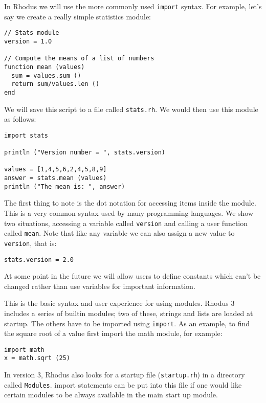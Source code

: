 In Rhodus we will use the more commonly used {\tt import} syntax. For example, let's say we create a really simple statistics module:

\begin{lstlisting}
// Stats module
version = 1.0

// Compute the means of a list of numbers
function mean (values)
  sum = values.sum ()
  return sum/values.len ()
end
\end{lstlisting}

We will save this script to a file called {\tt stats.rh}. We would then use this module as follows:

\begin{lstlisting}
import stats

println ("Version number = ", stats.version)

values = [1,4,5,6,2,4,5,8,9]
answer = stats.mean (values)
println ("The mean is: ", answer)
\end{lstlisting}

The first thing to note is the dot notation for accessing items inside the module. This is a very common syntax used by many programming languages. We show two situations, accessing a variable called {\tt version} and calling a user function called {\tt mean}. Note that like any variable we can also assign a new value to {\tt version}, that is:

\begin{lstlisting}
stats.version = 2.0
\end{lstlisting}

At some point in the future we will allow users to define constants which can't be changed rather than use variables for important information.

This is the basic syntax and user experience for using modules. Rhodus 3 includes a series of builtin modules; two of these, strings and lists are loaded at startup. The others have to be imported using {\tt import}. As an example, to find the square root of a value first import the math module, for example:

\begin{lstlisting}
import math
x = math.sqrt (25)
\end{lstlisting}

In version 3, Rhodus also looks for a startup file ({\tt startup.rh}) in a directory called {\tt Modules}. import statements can be put into this file if one would like certain modules to be always available in the main start up module.

